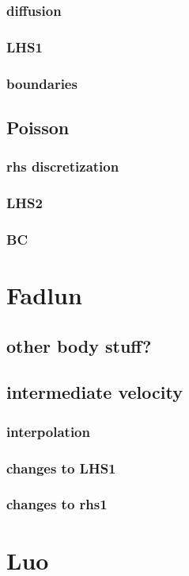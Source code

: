 \documentclass[onehalf,11pt]{beavtex}
\begin{document}
\subsubsection{diffusion}
\subsubsection{LHS1}
\subsubsection{boundaries}
\subsection{Poisson}
\subsubsection{rhs discretization}
\subsubsection{LHS2}
\subsubsection{BC}
\section{Fadlun}
\subsection{other body stuff?}
\subsection{intermediate velocity}
\subsubsection{interpolation}
\subsubsection{changes to LHS1} 
\subsubsection{changes to rhs1}
\section{Luo}
\end{document}

